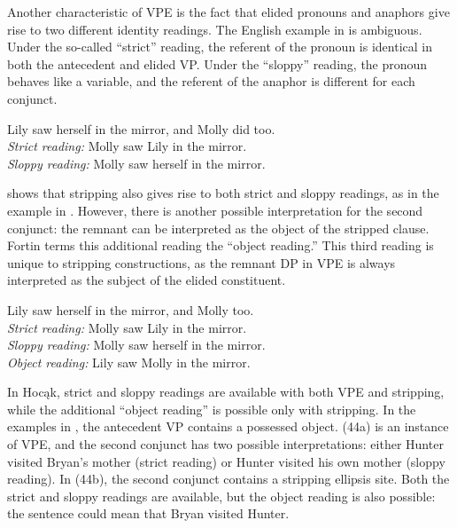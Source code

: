 \documentclass[output=paper]{LSP/langsci}
\begin{document}
Another characteristic of VPE is the fact that elided pronouns and anaphors give rise to two different identity readings. The English example in  is ambiguous. Under the so-called ``strict'' reading, the referent of the pronoun is identical in both the antecedent and elided VP. Under the ``sloppy'' reading, the pronoun behaves like a variable, and the referent of the anaphor is different for each conjunct.

\begin{exe}
\ex
Lily saw herself in the mirror, and Molly did too.\\
\textit{Strict reading:} Molly saw Lily in the mirror.\\
\textit{Sloppy reading:} Molly saw herself in the mirror.
\end{exe}

\citealt{Fortin2007} shows that stripping also gives rise to both strict and sloppy readings, as in the example in . However, there is another possible interpretation for the second conjunct: the remnant can be interpreted as the object of the stripped clause. Fortin terms this additional reading the ``object reading.'' This third reading is unique to stripping constructions, as the remnant DP in VPE is always interpreted as the subject of the elided constituent. 

\begin{exe}
\ex
Lily saw herself in the mirror, and Molly too.\\
\textit{Strict reading:} Molly saw Lily in the mirror.\\
\textit{Sloppy reading:} Molly saw herself in the mirror.\\
\textit{Object reading:} Lily saw Molly in the mirror.
\end{exe}

In Hocąk, strict and sloppy readings are available with both VPE and stripping, while the additional ``object reading'' is possible only with stripping. In the examples in , the antecedent VP contains a possessed object. (44a) is an instance of VPE, and the second conjunct has two possible interpretations: either Hunter visited Bryan's mother (strict reading) or Hunter visited his own mother (sloppy reading). In (44b), the second conjunct contains a stripping ellipsis site. Both the strict and sloppy readings are available, but the object reading is also possible: the sentence could mean that Bryan visited Hunter.
\end{document}
